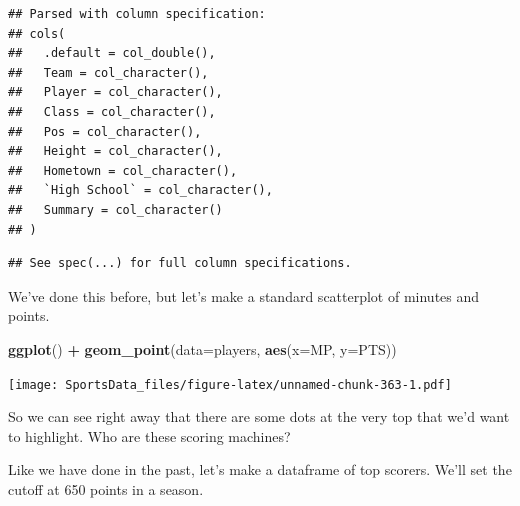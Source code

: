 \documentclass[
]{book}
\newenvironment{Shaded}{\begin{snugshade}}{\end{snugshade}}
\newcommand{\DataTypeTok}[1]{\textcolor[rgb]{0.13,0.29,0.53}{#1}}
\newcommand{\DecValTok}[1]{\textcolor[rgb]{0.00,0.00,0.81}{#1}}
\newcommand{\KeywordTok}[1]{\textcolor[rgb]{0.13,0.29,0.53}{\textbf{#1}}}
\newcommand{\NormalTok}[1]{#1}
\newcommand{\OperatorTok}[1]{\textcolor[rgb]{0.81,0.36,0.00}{\textbf{#1}}}
\newcommand{\StringTok}[1]{\textcolor[rgb]{0.31,0.60,0.02}{#1}}
\begin{document}
\begin{Shaded}
\end{Shaded}

\begin{verbatim}
## Parsed with column specification:
## cols(
##   .default = col_double(),
##   Team = col_character(),
##   Player = col_character(),
##   Class = col_character(),
##   Pos = col_character(),
##   Height = col_character(),
##   Hometown = col_character(),
##   `High School` = col_character(),
##   Summary = col_character()
## )
\end{verbatim}

\begin{verbatim}
## See spec(...) for full column specifications.
\end{verbatim}

We've done this before, but let's make a standard scatterplot of minutes and points.

\begin{Shaded}
\begin{Highlighting}[]
\KeywordTok{ggplot}\NormalTok{() }\OperatorTok{+}\StringTok{ }\KeywordTok{geom_point}\NormalTok{(}\DataTypeTok{data=}\NormalTok{players, }\KeywordTok{aes}\NormalTok{(}\DataTypeTok{x=}\NormalTok{MP, }\DataTypeTok{y=}\NormalTok{PTS))}
\end{Highlighting}
\end{Shaded}

\texttt{[image: SportsData\_files/figure-latex/unnamed-chunk-363-1.pdf]}

So we can see right away that there are some dots at the very top that we'd want to highlight. Who are these scoring machines?

Like we have done in the past, let's make a dataframe of top scorers. We'll set the cutoff at 650 points in a season.

\begin{Shaded}
\end{Shaded}
\end{document}

